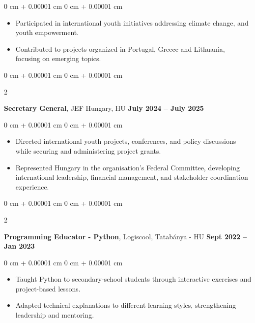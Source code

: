 \documentclass[10pt, letterpaper]{article}
\newenvironment{highlights}{
    \begin{itemize}[
        topsep=0.10 cm,
        parsep=0.10 cm,
        partopsep=0pt,
        itemsep=0pt,
        leftmargin=0 cm + 10pt
    ]
}{
    \end{itemize}
} %
\newenvironment{onecolentry}{
    \begin{adjustwidth}{
        0 cm + 0.00001 cm
    }{
        0 cm + 0.00001 cm
    }
}{
    \end{adjustwidth}
} %
\newenvironment{twocolentry}[2][]{
    \onecolentry
    \def\secondColumn{#2}
    \setcolumnwidth{\fill, 4.5 cm}
    \begin{paracol}{2}
}{
    \switchcolumn \raggedleft \secondColumn
    \end{paracol}
    \endonecolentry
} %
\begin{document}
        \vspace{0.10 cm}
        \begin{onecolentry}
            \begin{highlights}
                \item Participated in international youth initiatives addressing climate change, and youth empowerment.
                \item Contributed to projects organized in Portugal, Greece and Lithuania, focusing on emerging topics.
            \end{highlights}
        \end{onecolentry}

        \vspace{0.2 cm}

        \begin{twocolentry}{
            \textbf{July 2024 – July 2025}
        }
            \textbf{Secretary General}, JEF Hungary, HU\end{twocolentry}

        \vspace{0.10 cm}
        \begin{onecolentry}
            \begin{highlights}
                \item Directed international youth projects, conferences, and policy discussions while securing and administering project grants.
                \item Represented Hungary in the organisation’s Federal Committee, developing international leadership, financial management, and stakeholder-coordination experience.
            \end{highlights}
        \end{onecolentry}

        \vspace{0.2 cm}

        \begin{twocolentry}{
            \textbf{Sept 2022 – Jan 2023}
        }
            \textbf{Programming Educator - Python}, Logiscool, Tatabánya - HU\end{twocolentry}

        \vspace{0.10 cm}
        \begin{onecolentry}
            \begin{highlights}
                \item Taught Python to secondary-school students through interactive exercises and project-based lessons.
                \item Adapted technical explanations to different learning styles, strengthening leadership and mentoring.
            \end{highlights}
        \end{onecolentry}
\end{document}
